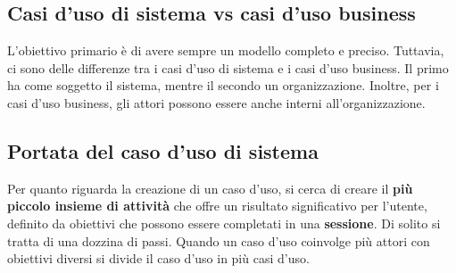 \documentclass{article}
\begin{document}
\subsection*{Casi d'uso di sistema vs casi d'uso business}
\large

L'obiettivo primario è di avere sempre un modello completo e preciso. Tuttavia, ci sono delle differenze tra i casi d'uso di sistema e i casi d'uso business. Il primo ha come soggetto il sistema, mentre il secondo un organizzazione. Inoltre, per i casi d'uso business, gli attori possono essere anche interni all'organizzazione.

\subsection*{Portata del caso d'uso di sistema}
\large

Per quanto riguarda la creazione di un caso d'uso, si cerca di creare il \textbf{più piccolo insieme di attività} che offre un risultato significativo per l'utente, definito da obiettivi che possono essere completati in una \textbf{sessione}. Di solito si tratta di una dozzina di passi. Quando un caso d'uso coinvolge più attori con obiettivi diversi si divide il caso d'uso in più casi d'uso.
\end{document}
